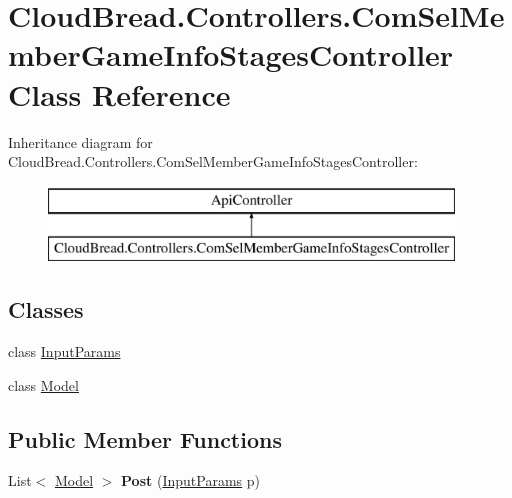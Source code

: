 \hypertarget{class_cloud_bread_1_1_controllers_1_1_com_sel_member_game_info_stages_controller}{}\section{Cloud\+Bread.\+Controllers.\+Com\+Sel\+Member\+Game\+Info\+Stages\+Controller Class Reference}
\label{class_cloud_bread_1_1_controllers_1_1_com_sel_member_game_info_stages_controller}
Inheritance diagram for Cloud\+Bread.\+Controllers.\+Com\+Sel\+Member\+Game\+Info\+Stages\+Controller\+:\begin{figure}[H]
\begin{center}
\leavevmode
\includegraphics[height=2.000000cm]{class_cloud_bread_1_1_controllers_1_1_com_sel_member_game_info_stages_controller}
\end{center}
\end{figure}
\subsection*{Classes}
\begin{DoxyCompactItemize}
\item 
class \hyperlink{class_cloud_bread_1_1_controllers_1_1_com_sel_member_game_info_stages_controller_1_1_input_params}{Input\+Params}
\item 
class \hyperlink{class_cloud_bread_1_1_controllers_1_1_com_sel_member_game_info_stages_controller_1_1_model}{Model}
\end{DoxyCompactItemize}
\subsection*{Public Member Functions}
\begin{DoxyCompactItemize}
\item 
List$<$ \hyperlink{class_cloud_bread_1_1_controllers_1_1_com_sel_member_game_info_stages_controller_1_1_model}{Model} $>$ {\bfseries Post} (\hyperlink{class_cloud_bread_1_1_controllers_1_1_com_sel_member_game_info_stages_controller_1_1_input_params}{Input\+Params} p)\hypertarget{class_cloud_bread_1_1_controllers_1_1_com_sel_member_game_info_stages_controller_a2ff1bd10fee42035eb3e8725ea83ec4e}{}\label{class_cloud_bread_1_1_controllers_1_1_com_sel_member_game_info_stages_controller_a2ff1bd10fee42035eb3e8725ea83ec4e}

\end{DoxyCompactItemize}


